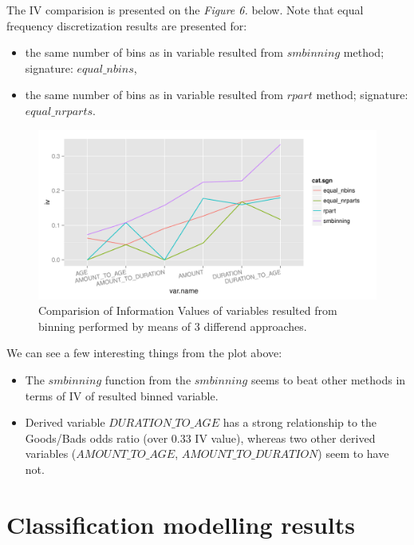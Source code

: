 \documentclass[10pt]{article}\usepackage[]{graphicx}\usepackage[]{color}
\newenvironment{knitrout}{}{} %
\begin{document}
The IV comparision is presented on the \textit{Figure 6.} below. Note that equal frequency discretization results are presented for:
\begin{itemize}
\item the same number of bins as in variable resulted from $smbinning$ method; signature: $equal\_nbins$,
\item the same number of bins as in variable resulted from $rpart$ method; signature: $equal\_nrparts$.
\end{itemize}



\begin{figure}[h!]
\centering
\begin{knitrout}
\color{fgcolor}
\includegraphics[width=.95\linewidth]{figure/unnamed-chunk-9-1} 

\end{knitrout}
\caption{Comparision of Information Values of variables resulted from binning performed by means of 3 differend approaches. }
\end{figure}

We can see a few interesting things from the plot above: 
\begin{itemize}
\item The $smbinning$ function from the $smbinning$ seems to beat other methods in terms of IV of resulted binned variable. 
\item Derived variable $DURATION\_TO\_AGE$ has a strong relationship to the Goods/Bads odds ratio (over 0.33 IV value), whereas two other derived variables ($AMOUNT\_TO\_AGE$, $AMOUNT\_TO\_DURATION$) seem to have not. 
\end{itemize}






\clearpage
\section{Classification modelling results}
\end{document}

